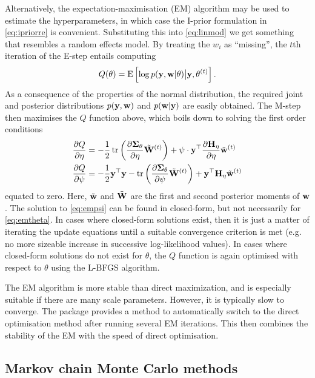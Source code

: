 Alternatively, the expectation-maximisation (EM) algorithm may be used to estimate the hyperparameters, in which case the I-prior formulation in \eqref{eq:ipriorre} is convenient.
Substituting this into \eqref{eq:linmod} we get something that resembles a random effects model.
By treating the $w_i$ as ``missing'', the $t$th iteration of the E-step entails computing
%
\begin{align}
  Q(\theta) = \operatorname{E} \left[ \log p({\mathbf y}, {\mathbf w} | \theta) \big\vert {\mathbf y},\theta^{(t)} \right].
\end{align}
%
As a consequence of the properties of the normal distribution, the required joint and posterior distributions $p({\mathbf y}, {\mathbf w})$ and $p({\mathbf w} | {\mathbf y})$ are easily obtained.
The M-step then maximises the $Q$ function above, which boils down to solving the first order conditions
%
\begin{align}
  \frac{\partial Q}{\partial\eta}
  &= -\frac{1}{2} \operatorname{tr} \left(\frac{\partial {\bm\Sigma}_\theta}{\partial\eta} \tilde{{\mathbf W}}^{(t)} \right) + \psi \cdot {\mathbf y} ^\top \frac{\partial {\mathbf H}_\eta}{\partial\eta} \tilde{{\mathbf w}}^{(t)} \label{eq:emtheta} \\
  \frac{\partial Q}{\partial\psi}
  &= -\frac{1}{2} {\mathbf y}^\top{\mathbf y} - \operatorname{tr} \left(\frac{\partial {\bm\Sigma}_\theta}{\partial\psi} \tilde{{\mathbf W}}^{(t)} \right) + {\mathbf y}^\top {\mathbf H}_\eta \tilde{{\mathbf w}}^{(t)} \label{eq:empsi}
\end{align}
%
equated to zero.
Here, $\tilde{{\mathbf w}}$ and $\tilde{{\mathbf W}}$ are the first and second posterior moments of ${\mathbf w}$.
The solution to \eqref{eq:empsi} can be found in closed-form, but not necessarily for \eqref{eq:emtheta}.
In cases where closed-form solutions exist, then it is just a matter of iterating the update equations until a suitable convergence criterion is met (e.g. no more sizeable increase in successive log-likelihood values).
In cases where closed-form solutions do not exist for $\theta$, the $Q$ function is again optimised with respect to $\theta$ using the L-BFGS algorithm.

The EM algorithm is more stable than direct maximization, and is especially suitable if there are many scale parameters. However, it is typically slow to converge.
The  package provides a method to automatically switch to the direct optimisation method after running several EM iterations.
This then combines the stability of the EM with the speed of direct optimisation.

\subsection{Markov chain Monte Carlo methods}

